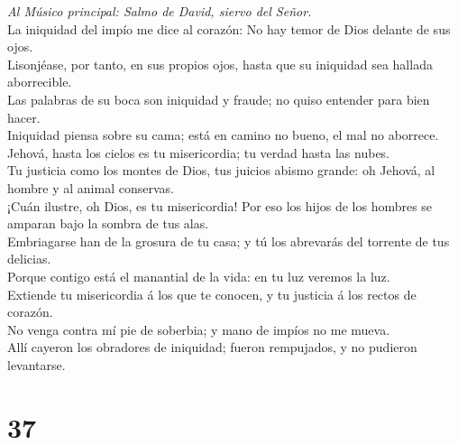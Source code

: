  \emph{Al Músico principal: Salmo de David, siervo del
Señor.}\\
La iniquidad del impío me dice al corazón: No hay temor de Dios delante
de sus ojos.\\
 Lisonjéase, por tanto, en sus propios ojos, hasta que su
iniquidad sea hallada aborrecible.\\
 Las palabras de su boca son iniquidad y fraude; no quiso
entender para bien hacer.\\
 Iniquidad piensa sobre su cama; está en camino no bueno, el
mal no aborrece.\\
 Jehová, hasta los cielos es tu misericordia; tu verdad
hasta las nubes.\\
 Tu justicia como los montes de Dios, tus juicios abismo
grande: oh Jehová, al hombre y al animal conservas.\\
 ¡Cuán ilustre, oh Dios, es tu misericordia! Por eso los
hijos de los hombres se amparan bajo la sombra de tus alas.\\
 Embriagarse han de la grosura de tu casa; y tú los
abrevarás del torrente de tus delicias.\\
 Porque contigo está el manantial de la vida: en tu luz
veremos la luz.\\
 Extiende tu misericordia á los que te conocen, y tu
justicia á los rectos de corazón.\\
 No venga contra mí pie de soberbia; y mano de impíos no me
mueva.\\
 Allí cayeron los obradores de iniquidad; fueron
rempujados, y no pudieron levantarse.

\hypertarget{section-36}{%
\section{37}\label{section-36}}

